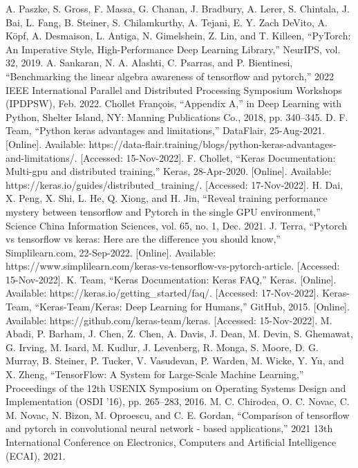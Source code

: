 \documentclass[conference]{IEEEtran}
\begin{document}
\begin{thebibliography}{00}

A. Paszke, S. Gross, F. Massa, G. Chanan, J. Bradbury, A. Lerer, S. Chintala, J. Bai, L. Fang, B. Steiner, S. Chilamkurthy, A. Tejani, E. Y. Zach DeVito, A. Köpf, A. Desmaison, L. Antiga, N. Gimelshein, Z. Lin, and T. Killeen, “PyTorch: An Imperative Style, High-Performance Deep Learning Library,” NeurIPS, vol. 32, 2019. 
A. Sankaran, N. A. Alashti, C. Psarras, and P. Bientinesi, “Benchmarking the linear algebra awareness of tensorflow and pytorch,” 2022 IEEE International Parallel and Distributed Processing Symposium Workshops (IPDPSW), Feb. 2022. 
Chollet François, “Appendix A,” in Deep Learning with Python, Shelter Island, NY: Manning Publications Co., 2018, pp. 340–345. 
D. F. Team, “Python keras advantages and limitations,” DataFlair, 25-Aug-2021. [Online]. Available: https://data-flair.training/blogs/python-keras-advantages-and-limitations/. [Accessed: 15-Nov-2022]. 
F. Chollet, “Keras Documentation: Multi-gpu and distributed training,” Keras, 28-Apr-2020. [Online]. Available: https://keras.io/guides/distributed\_training/. [Accessed: 17-Nov-2022]. 
H. Dai, X. Peng, X. Shi, L. He, Q. Xiong, and H. Jin, “Reveal training performance mystery between tensorflow and Pytorch in the single GPU environment,” Science China Information Sciences, vol. 65, no. 1, Dec. 2021. 
J. Terra, “Pytorch vs tensorflow vs keras: Here are the difference you should know,” Simplilearn.com, 22-Sep-2022. [Online]. Available: https://www.simplilearn.com/keras-vs-tensorflow-vs-pytorch-article. [Accessed: 15-Nov-2022]. 
K. Team, “Keras Documentation: Keras FAQ,” Keras. [Online]. Available: https://keras.io/getting\_started/faq/. [Accessed: 17-Nov-2022]. 
Keras-Team, “Keras-Team/Keras: Deep Learning for Humans,” GitHub, 2015. [Online]. Available: https://github.com/keras-team/keras. [Accessed: 15-Nov-2022]. 
M. Abadi, P. Barham, J. Chen, Z. Chen, A. Davis, J. Dean, M. Devin, S. Ghemawat, G. Irving, M. Isard, M. Kudlur, J. Levenberg, R. Monga, S. Moore, D. G. Murray, B. Steiner, P. Tucker, V. Vasudevan, P. Warden, M. Wicke, Y. Yu, and X. Zheng, “TensorFlow: A System for Large-Scale Machine Learning,” Proceedings of the 12th USENIX Symposium on Operating Systems Design and Implementation (OSDI ’16), pp. 265–283, 2016. 
M. C. Chirodea, O. C. Novac, C. M. Novac, N. Bizon, M. Oproescu, and C. E. Gordan, “Comparison of tensorflow and pytorch in convolutional neural network - based applications,” 2021 13th International Conference on Electronics, Computers and Artificial Intelligence (ECAI), 2021. 

\end{thebibliography}
\end{document}
